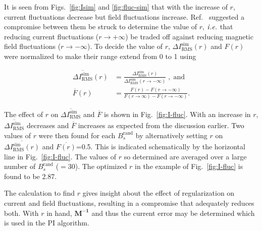 It is seen from Figs.~\ref{fig:Isim} and \ref{fig:fluc-sim} that with the increase of $r$, current fluctuations decrease but field fluctuations increase. Ref.~\cite{bea} suggested a compromise between them be struck to determine the value of $r$, $\it i.e.$ that reducing current fluctuations ($r \rightarrow + \infty$) be traded off against reducing magnetic field fluctuations ($r \rightarrow - \infty$). To decide the value of $r$, $\Delta I_{\text{RMS}}^{\text{sim}}(r)$ and $F(r)$ were normalized to make their range extend from 0 to 1 using

\begin{align}
    \overline{\Delta I_{\text{RMS}}^{\text{sim}}}(r) &= \frac{\Delta I_{\text{RMS}}^{\text{sim}}(r)}{\Delta I_{\text{RMS}}^{\text{sim}}(r\rightarrow - \infty)} \;\mathrm{,\;and}\label{eq:Inorm}\\
    \overline{F}(r) &= \frac{F(r)- F(r\rightarrow - \infty)}{F(r\rightarrow \infty)- F(r\rightarrow - \infty)}\text{.}\label{eq:flucNorm}
\end{align}


The effect of $r$ on $\overline{\Delta I_{\text{RMS}}^{\text{sim}}}$ and $\overline{F}$ is shown in Fig.~\ref{fig:I-fluc}. With an increase in $r$, $\overline{\Delta I_{\text{RMS}}^{\text{sim}}}$ decreases and $\overline{F}$ increases as expected from the discussion earlier.
Two values of $r$ were then found for each $B_s^{\text{rand}}$ by alternatively setting $r$ on $\overline{\Delta I_{\text{RMS}}^{\text{sim}}(r)}$ and $\overline{F(r)}$=0.5. This is indicated schematically by the horizontal line in Fig.~\ref{fig:I-fluc}. The values of $r$ so determined are averaged over a large number of $B_s^{\text{rand}}$ ($=30$). The optimized $r$ in the example of Fig.~\ref{fig:I-fluc} is found to be 2.87.


The calculation to find $r$ gives insight about the effect of regularization on current and field fluctuations, resulting in a compromise that adequately reduces both. With $r$ in hand, $\bm{M^{-1}}$ and thus the current error may be determined which is used in the PI algorithm.

